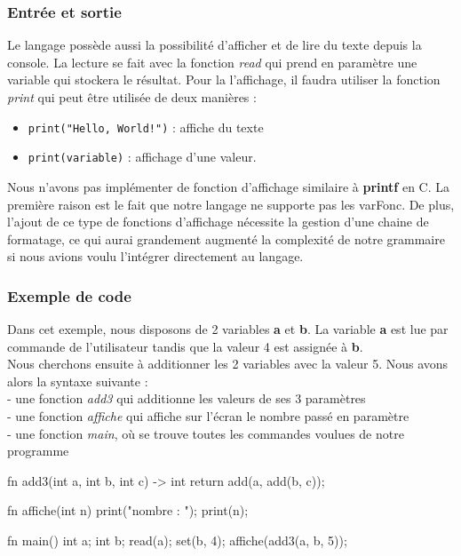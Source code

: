\documentclass[a4paper]{article}%
\begin{document}
\subsubsection*{Entrée et sortie}

Le langage possède aussi la possibilité d'afficher et de lire du texte depuis la
console. La lecture se fait avec la fonction \textit{read} qui prend en
paramètre une variable qui stockera le résultat. Pour la l'affichage, il faudra
utiliser la fonction \textit{print} qui peut être utilisée de deux manières :

\begin{itemize}
  \item \lstinline{print("Hello, World!")} : affiche du texte
  \item \lstinline{print(variable)} : affichage d'une valeur.
\end{itemize}

Nous n'avons pas implémenter de fonction d'affichage similaire à \textbf{printf}
en C. La première raison est le fait que notre langage ne supporte pas les
\gls{varFonc}. De plus, l'ajout de ce type de fonctions d'affichage nécessite la
gestion d'une chaine de formatage, ce qui aurai grandement augmenté la
complexité de notre grammaire si nous avions voulu l'intégrer directement au
langage.

\subsubsection*{Exemple de code}

Dans cet exemple, nous disposons de 2 variables \textbf{a} et \textbf{b}. La
variable \textbf{a} est lue par commande de l'utilisateur tandis que la valeur 4
est assignée à \textbf{b}.\\
Nous cherchons ensuite à additionner les 2 variables avec la valeur 5. Nous avons alors la syntaxe suivante :\\
- une fonction \textit{add3} qui additionne les valeurs de ses 3 paramètres\\
- une fonction \textit{affiche} qui affiche sur l'écran le nombre passé en paramètre\\
- une fonction \textit{main}, où se trouve toutes les commandes voulues de notre programme\\



\begin{grammar}[language=C++]
fn add3(int a, int b, int c) -> int {
    return add(a, add(b, c));
}

fn affiche(int n) {
    print("nombre : ");
    print(n);
}

fn main() {
    int a;
    int b;
    read(a);
    set(b, 4);
    affiche(add3(a, b, 5));
}
\end{grammar}\leavevmode\newline
\end{document}

